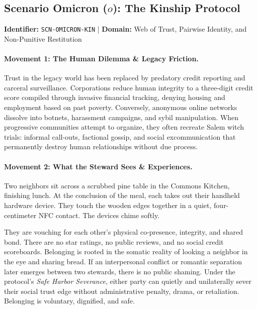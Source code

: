 \subsection{Scenario Omicron (\texorpdfstring{$o$}{Omicron}): The Kinship Protocol}
\label{subsec:scn_omicron}
\textbf{Identifier:} \texttt{SCN-OMICRON-KIN} \quad | \quad \textbf{Domain:} Web of Trust, Pairwise Identity, and Non-Punitive Restitution

\paragraph{Movement 1: The Human Dilemma \& Legacy Friction.}
Trust in the legacy world has been replaced by predatory credit reporting and carceral surveillance. Corporations reduce human integrity to a three-digit credit score compiled through invasive financial tracking, denying housing and employment based on past poverty. Conversely, anonymous online networks dissolve into botnets, harassment campaigns, and sybil manipulation. When progressive communities attempt to organize, they often recreate Salem witch trials: informal call-outs, factional gossip, and social excommunication that permanently destroy human relationships without due process.

\paragraph{Movement 2: What the Steward Sees \& Experiences.}
Two neighbors sit across a scrubbed pine table in the Commons Kitchen, finishing lunch. At the conclusion of the meal, each takes out their handheld hardware device. They touch the wooden edges together in a quiet, four-centimeter NFC contact. The devices chime softly. 

They are vouching for each other's physical co-presence, integrity, and shared bond. There are no star ratings, no public reviews, and no social credit scoreboards. Belonging is rooted in the somatic reality of looking a neighbor in the eye and sharing bread. If an interpersonal conflict or romantic separation later emerges between two stewards, there is no public shaming. Under the protocol's \textit{Safe Harbor Severance}, either party can quietly and unilaterally sever their social trust edge without administrative penalty, drama, or retaliation. Belonging is voluntary, dignified, and safe.

